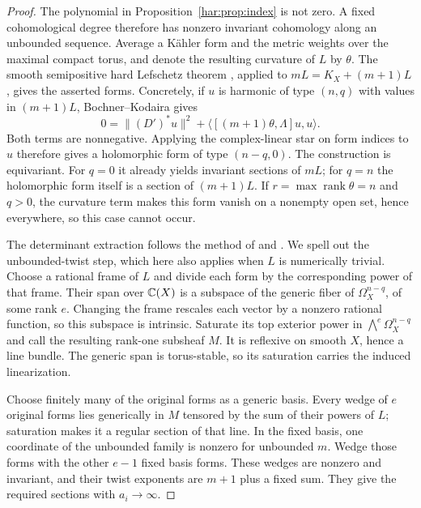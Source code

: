 \begin{proof}
The polynomial in Proposition~\ref{har:prop:index} is not zero. A fixed
cohomological degree therefore has nonzero invariant cohomology along an
unbounded sequence. Average a Kähler form and the metric weights over
the maximal compact torus, and denote the resulting curvature of \(L\)
by \(\theta\). The smooth semipositive hard Lefschetz theorem
\cite[Corollary~2.1.2]{DPS2001}, applied to \(mL=K_X+(m+1)L\),
gives the asserted forms. Concretely, if \(u\) is harmonic
of type \((n,q)\) with values in \((m+1)L\), Bochner--Kodaira gives
\[
 0=\|(D')^*u\|^2+\langle[(m+1)\theta,\Lambda]u,u\rangle.
\]
Both terms are nonnegative. Applying the complex-linear star on form
indices to $u$ therefore gives a holomorphic form of type \((n-q,0)\).
The construction is equivariant.
For \(q=0\) it already yields invariant sections of \(mL\); for \(q=n\)
the holomorphic form itself is a section of \((m+1)L\). If
\(r=\max\operatorname{rank}\theta=n\) and
\(q>0\), the curvature term makes this form vanish on a nonempty open set,
hence everywhere, so this case cannot occur.

The determinant extraction follows the method of
\cite[Lemma~5.1]{LMPTX2023} and \cite[Lemma~4.1]{LP2018}.
We spell out the unbounded-twist step, which here also applies when
$L$ is numerically trivial. Choose a rational frame of $L$ and divide
each form by the corresponding power of that frame. Their span over
$\mathbb C(X)$ is a subspace of the generic fiber of $\Omega_X^{n-q}$,
of some rank $e$. Changing the frame rescales each vector by a nonzero
rational function, so this subspace is intrinsic. Saturate its top
exterior power in $\bigwedge^e\Omega_X^{n-q}$ and call the resulting
rank-one subsheaf $M$. It is reflexive on smooth $X$, hence a line
bundle. The generic span is torus-stable, so its saturation carries the
induced linearization.

Choose finitely many of the original forms as a generic basis. Every
wedge of $e$ original forms lies generically in $M$ tensored by the
sum of their powers of $L$; saturation makes it a regular section of
that line. In the fixed basis, one coordinate of the unbounded family
is nonzero for unbounded $m$. Wedge those forms with the other $e-1$
fixed basis forms. These wedges are nonzero and invariant, and their
twist exponents are $m+1$ plus a fixed sum. They give the required
sections with $a_i\to\infty$.
\end{proof}


